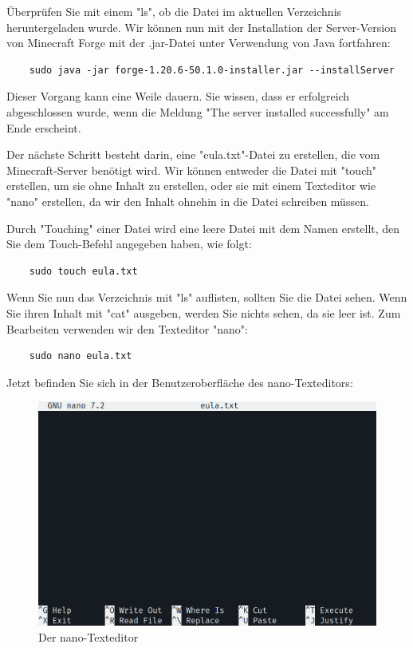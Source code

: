 \documentclass[]{article}
\begin{document}
Überprüfen Sie mit einem "ls", ob die Datei im aktuellen Verzeichnis heruntergeladen wurde. Wir können nun mit der Installation der Server-Version von Minecraft Forge mit der .jar-Datei unter Verwendung von Java fortfahren:

\begin{verbatim}
	sudo java -jar forge-1.20.6-50.1.0-installer.jar --installServer
\end{verbatim}

Dieser Vorgang kann eine Weile dauern. Sie wissen, dass er erfolgreich abgeschlossen wurde, wenn die Meldung "The server installed successfully" am Ende erscheint.

Der nächste Schritt besteht darin, eine "eula.txt"-Datei zu erstellen, die vom Minecraft-Server benötigt wird. Wir können entweder die Datei mit "touch" erstellen, um sie ohne Inhalt zu erstellen, oder sie mit einem Texteditor wie "nano" erstellen, da wir den Inhalt ohnehin in die Datei schreiben müssen.

Durch "Touching" einer Datei wird eine leere Datei mit dem Namen erstellt, den Sie dem Touch-Befehl angegeben haben, wie folgt:

\begin{verbatim}
	sudo touch eula.txt
\end{verbatim}

Wenn Sie nun das Verzeichnis mit "ls" auflisten, sollten Sie die Datei sehen. Wenn Sie ihren Inhalt mit "cat" ausgeben, werden Sie nichts sehen, da sie leer ist. Zum Bearbeiten verwenden wir den Texteditor "nano":

\begin{verbatim}
	sudo nano eula.txt
\end{verbatim}

Jetzt befinden Sie sich in der Benutzeroberfläche des nano-Texteditors:

\begin{figure}[h!]
	\caption{Der nano-Texteditor}
	\centering
	\includegraphics[width=1\textwidth]{nano}
\end{figure}
\FloatBarrier
\end{document}
